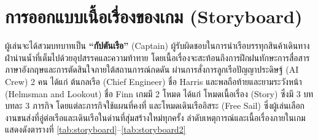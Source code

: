 
\section{การออกแบบเนื้อเรื่องของเกม (Storyboard)}

ผู้เล่นจะได้สวมบทบาทเป็น \textbf{``กัปตันเรือ''} (Captain) ผู้รับผิดชอบในการนำเรือบรรทุกสินค้าเดินทางฝ่าน่านน้ำที่เต็มไปด้วยอุปสรรคและความท้าทาย โดยเนื้อเรื่องจะสะท้อนถึงการฝึกฝนทักษะการสื่อสารภาษาอังกฤษและการตัดสินใจภายใต้สถานการณ์กดดัน ผ่านการสั่งการลูกเรือปัญญาประดิษฐ์ (AI Crew) 2 คน ได้แก่ ต้นกลเรือ (Chief Engineer) ชื่อ Harris และพลถือท้ายและยามระวังหน้า (Helmsman and Lookout) ชื่อ Finn เกมมี 2 โหมด ได้แก่ โหมดเนื้อเรื่อง (Story) ซึ่งมี 3 บท บทละ 3 ภารกิจ โดยแต่ละภารกิจใช้แผนที่คงที่ และโหมดเดินเรืออิสระ (Free Sail) ซึ่งผู้เล่นเลือกงานขนส่งที่อู่ต่อเรือและเดินเรือในด่านที่สุ่มสร้างใหม่ทุกครั้ง ลำดับเหตุการณ์และเนื้อเรื่องภายในเกมแสดงดังตารางที่ \ref{tab:storyboard}--\ref{tab:storyboard2}

